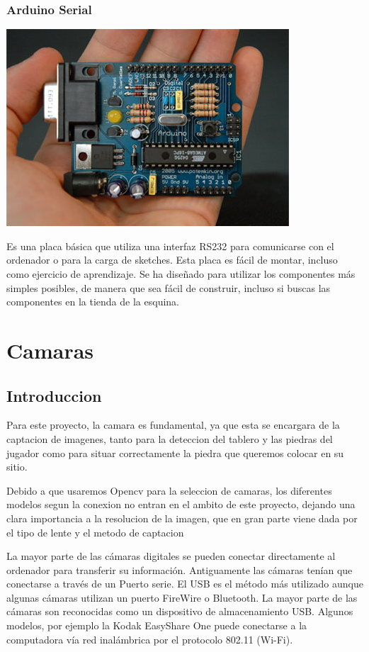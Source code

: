 \documentclass[12pt,a4paper]{report}
\begin{document}
\subsection{Arduino Serial}

\includegraphics[scale=0.6]{arduino.jpg}

Es una placa básica que utiliza una interfaz RS232 para comunicarse con el ordenador o para la carga de sketches. Esta placa es fácil de montar, incluso como ejercicio de aprendizaje. Se ha diseñado para utilizar los componentes más simples posibles, de manera que sea fácil de construir, incluso si buscas las componentes en la tienda de la esquina.







\chapter{Camaras}
\section{Introduccion}

Para este proyecto, la camara es fundamental, ya que esta se encargara de la captacion de imagenes, tanto para la deteccion del tablero y las piedras del jugador como para situar correctamente la piedra que queremos colocar en su sitio.

Debido a que usaremos Opencv para la seleccion de camaras, los diferentes modelos segun la conexion no entran en el ambito de este proyecto, dejando una clara importancia a la resolucion de la imagen, que en gran parte viene dada por el tipo de lente y el metodo de captacion 

La mayor parte de las cámaras digitales se pueden conectar directamente al ordenador para transferir su información. Antiguamente las cámaras tenían que conectarse a través de un Puerto serie. El USB es el método más utilizado aunque algunas cámaras utilizan un puerto FireWire o Bluetooth. La mayor parte de las cámaras son reconocidas como un dispositivo de almacenamiento USB. Algunos modelos, por ejemplo la Kodak EasyShare One puede conectarse a la computadora vía red inalámbrica por el protocolo 802.11 (Wi-Fi).
\end{document}
